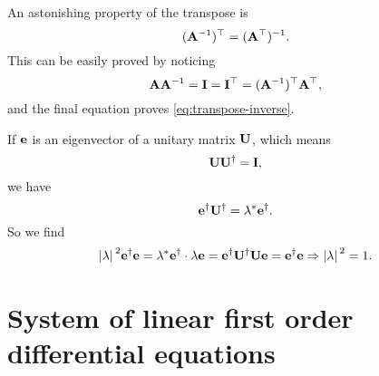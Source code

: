 \documentclass[hyperref, a4paper]{article}
\newcommand*{\mat}[1]{\vb{#1}}
\begin{document}
An astonishing property of the transpose is 
\begin{equation}
    (\mat{A}^{-1})^\top = (\mat{A}^\top)^{-1}.
    \label{eq:transpose-inverse}
\end{equation}
This can be easily proved by noticing 
\begin{equation}
    \mat{A} \mat{A}^{-1} = \mat{I} = \mat{I}^\top = (\mat{A}^{-1})^\top \mat{A}^\top,
\end{equation}
and the final equation proves \eqref{eq:transpose-inverse}.

If $\vb{e}$ is an eigenvector of a unitary matrix $\mat{U}$, 
which means 
\begin{equation}
    \mat{U} \mat{U}^\dagger = \mat{I},
\end{equation}
we have
\begin{equation}
    \vb{e}^\dagger \mat{U}^\dagger = \lambda^* \vb{e}^\dagger.
\end{equation}
So we find 
\begin{equation}
    \abs*{\lambda}^2 \vb{e}^\dagger \vb{e} 
    = \lambda^* \vb{e}^\dagger \cdot \lambda \vb{e}
    = \vb{e}^\dagger \mat{U}^\dagger \mat{U} \vb{e}
    = \vb{e}^\dagger \vb{e} 
    \Rightarrow \abs*{\lambda}^2 = 1.
\end{equation}

\section{System of linear first order differential equations}
\end{document}
